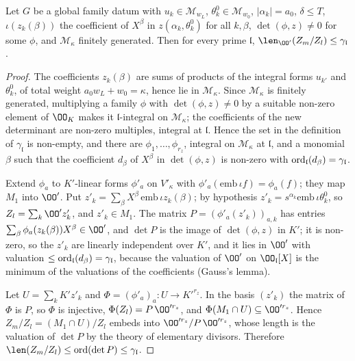 \begin{lemma}\label{pf:onto1:gaussC}
Let $G$ be a global family datum with $u_k\in\mathcal M_{w_L}$, $\theta^0_k\in\mathcal M_{w_0}$, $|\alpha_k|=a_0$, $\delta\le T$,
$\iota(z_k(\beta))$ the coefficient of $X^\beta$ in $z(\alpha_k,\theta^0_k)$ for all $k,\beta$, $\det(\phi,z)\ne0$ for some $\phi$,
and $\mathcal M_\kappa$ finitely generated. Then for every prime $\mathfrak l$, $\len_{\OO'}(Z_m/Z_l)\le\gamma_{\mathfrak l}$.
\end{lemma}

\begin{proof}
The coefficients $z_k(\beta)$ are sums of products of the integral forms $u_{k'}$ and $\theta^0_k$, of total weight
$a_0w_L+w_0=\kappa$, hence lie in $\mathcal M_\kappa$. Since $\mathcal M_\kappa$ is finitely generated, multiplying a family $\phi$
with $\det(\phi,z)\ne0$ by a suitable non-zero element of $\OO_K$ makes it $\mathfrak l$-integral on $\mathcal M_\kappa$; the
coefficients of the new determinant are non-zero multiples, integral at $\mathfrak l$. Hence the set in the definition of
$\gamma_{\mathfrak l}$ is non-empty, and there are $\phi_1,\dots,\phi_{r_z}$, integral on $\mathcal M_\kappa$ at $\mathfrak l$, and a
monomial $\beta$ such that the coefficient $d_\beta$ of $X^\beta$ in $\det(\phi,z)$ is non-zero with
$\operatorname{ord}_{\mathfrak l}(d_\beta)=\gamma_{\mathfrak l}$.

Extend $\phi_a$ to $K'$-linear forms $\phi'_a$ on $V'_\kappa$ with $\phi'_a(\mathrm{emb}\,\iota f)=\phi_a(f)$; they map
$M_1$ into $\OO'$. Put $z'_k=\sum_\beta X^\beta\,\mathrm{emb}\,\iota z_k(\beta)$; by hypothesis $z'_k=s^{\alpha_k}\mathrm{emb}\,
\iota\theta^0_k$, so $Z_l=\sum_k\OO'z'_k$, and $z'_k\in M_1$. The matrix $P=(\phi'_a(z'_k))_{a,k}$ has entries
$\sum_\beta\phi_a(z_k(\beta))X^\beta\in\OO'$, and $\det P$ is the image of $\det(\phi,z)$ in $K'$; it is non-zero, so the $z'_k$
are linearly independent over $K'$, and it lies in $\OO'$ with valuation $\le\operatorname{ord}_{\mathfrak l}(d_\beta)=\gamma_{\mathfrak l}$,
because the valuation of $\OO'$ on $\OO_{\mathfrak l}[X]$ is the minimum of the valuations of the coefficients (Gauss's
lemma).

Let $U=\sum_kK'z'_k$ and $\Phi=(\phi'_a)_a\colon U\to K'^{r_z}$. In the basis $(z'_k)$ the matrix of $\Phi$ is $P$, so $\Phi$ is
injective, $\Phi(Z_l)=P\,\OO'^{r_z}$, and $\Phi(M_1\cap U)\subseteq\OO'^{r_z}$. Hence $Z_m/Z_l=(M_1\cap U)/Z_l$ embeds into
$\OO'^{r_z}/P\,\OO'^{r_z}$, whose length is the valuation of $\det P$ by the theory of elementary divisors. Therefore
$\len(Z_m/Z_l)\le\ontooneord(\det P)\le\gamma_{\mathfrak l}$.
\end{proof}

